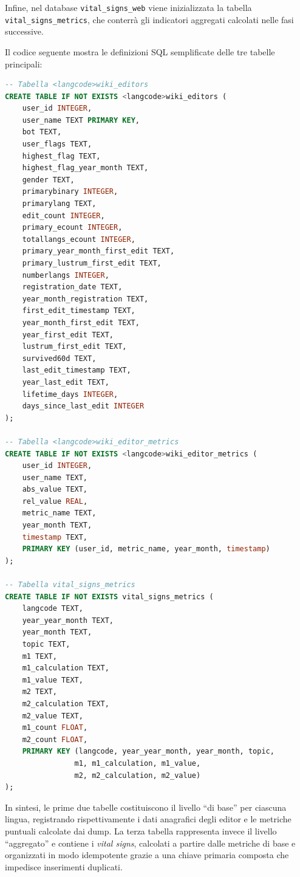 Infine, nel database \texttt{vital\_signs\_web} viene inizializzata la tabella \texttt{vital\_signs\_metrics}, che conterrà gli indicatori aggregati calcolati nelle fasi successive. 

Il codice seguente mostra le definizioni SQL semplificate delle tre tabelle principali:

\newpage 

\begin{lstlisting}[language=SQL, caption={Definizione delle tabelle create dalla task create\_dbs}, label=lst:create_dbs_tables, basicstyle=\scriptsize\ttfamily]
-- Tabella <langcode>wiki_editors
CREATE TABLE IF NOT EXISTS <langcode>wiki_editors (
    user_id INTEGER,
    user_name TEXT PRIMARY KEY,
    bot TEXT,
    user_flags TEXT,
    highest_flag TEXT,
    highest_flag_year_month TEXT,
    gender TEXT,
    primarybinary INTEGER,
    primarylang TEXT,
    edit_count INTEGER,
    primary_ecount INTEGER,
    totallangs_ecount INTEGER,
    primary_year_month_first_edit TEXT,
    primary_lustrum_first_edit TEXT,
    numberlangs INTEGER,
    registration_date TEXT,
    year_month_registration TEXT,
    first_edit_timestamp TEXT,
    year_month_first_edit TEXT,
    year_first_edit TEXT,
    lustrum_first_edit TEXT,
    survived60d TEXT,
    last_edit_timestamp TEXT,
    year_last_edit TEXT,
    lifetime_days INTEGER,
    days_since_last_edit INTEGER
);

-- Tabella <langcode>wiki_editor_metrics
CREATE TABLE IF NOT EXISTS <langcode>wiki_editor_metrics (
    user_id INTEGER,
    user_name TEXT,
    abs_value TEXT,
    rel_value REAL,
    metric_name TEXT,
    year_month TEXT,
    timestamp TEXT,
    PRIMARY KEY (user_id, metric_name, year_month, timestamp)
);

-- Tabella vital_signs_metrics
CREATE TABLE IF NOT EXISTS vital_signs_metrics (
    langcode TEXT,
    year_year_month TEXT,
    year_month TEXT,
    topic TEXT,
    m1 TEXT,
    m1_calculation TEXT,
    m1_value TEXT,
    m2 TEXT,
    m2_calculation TEXT,
    m2_value TEXT,
    m1_count FLOAT,
    m2_count FLOAT,
    PRIMARY KEY (langcode, year_year_month, year_month, topic, 
                m1, m1_calculation, m1_value, 
                m2, m2_calculation, m2_value)
);
\end{lstlisting}

In sintesi, le prime due tabelle costituiscono il livello “di base” per ciascuna lingua, registrando rispettivamente i dati anagrafici degli editor e le metriche puntuali calcolate dai dump. 
La terza tabella rappresenta invece il livello “aggregato” e contiene i \emph{vital signs}, calcolati a partire dalle metriche di base e organizzati in modo idempotente grazie a una chiave primaria composta che impedisce inserimenti duplicati.  

